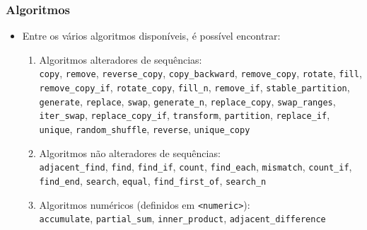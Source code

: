 \documentclass[xcolor={dvipsnames,table},aspectratio=169]{beamer}
\begin{document}
\begin{frame}\frametitle{Algoritmos}
\begin{itemize}
	\item Entre os vários algoritmos disponíveis, é possível encontrar:
	\begin{enumerate}
		\item Algoritmos alteradores de sequências:\\
		\texttt{copy}, \texttt{remove}, \texttt{reverse\_copy}, \texttt{copy\_backward}, \texttt{remove\_copy}, \texttt{rotate}, \texttt{fill}, \texttt{remove\_copy\_if}, \texttt{rotate\_copy}, \texttt{fill\_n}, \texttt{remove\_if}, \texttt{stable\_partition}, \texttt{generate}, \texttt{replace}, \texttt{swap}, \texttt{generate\_n}, \texttt{replace\_copy}, \texttt{swap\_ranges}, \texttt{iter\_swap}, \texttt{replace\_copy\_if}, \texttt{transform}, \texttt{partition}, \texttt{replace\_if}, \texttt{unique}, \texttt{random\_shuffle}, \texttt{reverse}, \texttt{unique\_copy}
		\item Algoritmos não alteradores de sequências:\\
		\texttt{adjacent\_find}, \texttt{find}, \texttt{find\_if}, \texttt{count}, \texttt{find\_each}, \texttt{mismatch}, \texttt{count\_if}, \texttt{find\_end}, \texttt{search}, \texttt{equal}, \texttt{find\_first\_of}, \texttt{search\_n}
		\item Algoritmos numéricos (definidos em \texttt{<numeric>}):\\
		\texttt{accumulate}, \texttt{partial\_sum}, \texttt{inner\_product}, \texttt{adjacent\_difference}
	\end{enumerate}

\end{itemize}
\end{frame}
\end{document}
